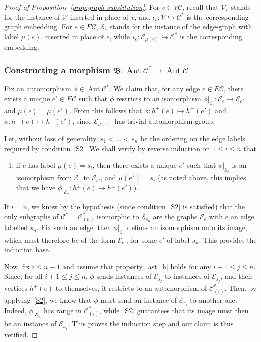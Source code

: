 \documentclass[ALCO,ThmDefs,Unicode,epreuves]{cedram}
\newcommand{\cC}{\mathcal{C}}
\newcommand{\cV}{\mathcal{V}}
\newcommand{\cE}{\mathcal{E}}
\DeclareMathOperator{\aut}{Aut}
\newcommand{\Con}{\mathfrak{B}}
\begin{document}
 
\begin{proof}[Proof of Proposition~\ref{prop:graph-substitution}] For $v\in V\cC$, recall that $\cV_v$ stands for the instance of $\cV$ inserted in place of $v$, and ${\iota}_v:\cV {\hookrightarrow} \cC^*$ is the corresponding graph embedding. For $e\in E\cC$, $\cE_e$ stands for the instance of the edge-graph with label $\mu(e)$, inserted in place of $e$, while ${\iota}_e:\cE_{{\mu}(e)}{\hookrightarrow} \cC^*$ is the corresponding embedding.

 
\subsubsection*{Constructing a morphism $\Con: \aut \cC^* \to \aut \cC$} Fix an automorphism $\phi \in \aut \cC^*$. We claim that, for any edge $e\in E\cC$, there exists a unique $e'\in E\cC$ such that ${\phi}$ restricts to an isomorphism ${\phi}|_{\cE_e}:\cE_e \to \cE_{e'}$ and ${\mu}(e) = {\mu}(e')$. From this follows that ${\phi}:h^{+}(e) \mapsto h^{+}(e')$ and ${\phi}:h^{-}(e) \mapsto h^{-}(e')$, since $\cE_{{\mu}(e)}$ has trivial automorphism group.

Let, without loss of generality, $s_{1} < \dots < s_n$ be the ordering on the edge labels required by condition~\ref{S2}. We shall verify by reverse induction on $1\leq i\leq n$ that 

\begin{enumerate}
\renewcommand{\theenumi}{$\ast$}
\renewcommand{\labelenumi}{(\theenumi)}
\item\label{ast_h} if $e$ has label $\mu(e) = s_i$, then there exists a unique $e'$ such that ${\phi}|_{\cE_e}$ is an isomorphism from $\cE_e$ to $\cE_{e'}$, and $\mu(e')=s_i$ (as noted above, this implies that we have ${\phi}|_{\cE_e}: h^{\pm}(e) \mapsto h^{\pm}(e')$).
\end{enumerate} 

If $i=n$, we know by the hypothesis (since condition~\ref{S2} is satisfied) that the only subgraphs of $\cC^*=\cC^*_{(n)}$ isomorphic to $\cE_{s_{n}}$ are the graphs $\cE_e$ with $e$ an edge labelled $s_{n}$. Fix such an edge: then ${\phi}|_{\cE_e}$ defines an isomorphism onto its image, which must therefore be of the form $\cE_{e'}$, for some $e'$ of label $s_{n}$. This provides the induction base.
 
Now, fix $i \leq n-1$ and assume that property~\eqref{ast_h} holds for any $i+1\leq j\leq n$. Since, for all $i+1\leq j\leq n$, ${\phi}$ sends instances of $\cE_{s_j}$ to instances of $\cE_{s_j}$, and their vertices $h^{\pm}(e)$ to themselves, it restricts to an automorphism of $\cC^*_{(i)}$. Then, by applying~\ref{S2}, we know that ${\phi}$ must send an instance of $\cE_{s_{i}}$ to another one. Indeed, ${\phi}|_{\cE_{s_{i}}}$ has range in $\cC^*_{(i)}$, while~\ref{S2} guarantees that its image must then be an instance of $\cE_{s_{i}}$. This proves the induction step and our claim is thus verified.
 


\end{proof}
\end{document}
